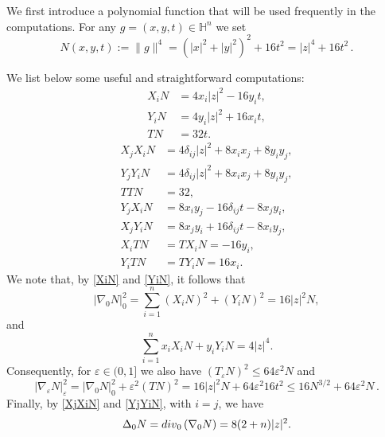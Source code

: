 \documentclass[10pt]{amsart}
\numberwithin{equation}{section}
\theoremstyle{definition}
\newcommand{\He}{\mathbb{H}}
\begin{document}
We first introduce a polynomial function that will be used frequently in the computations. For any $g=(x,y,t) \in \He^n$ we set
\begin{equation}\label{N}
N(x,y,t):= \| g\|^4= \left(|x|^2 + |y|^2\right)^2 + 16 t^2 = |z|^4 +16t^2 \, .
\end{equation}

We list below some useful and straightforward computations: 
\begin{align}
\label{XiN} X_i N &= 4x_i |z|^2  - 16 y_i t,\\
\label{YiN} Y_i N &= 4y_i |z|^2 + 16 x_i t,\\
\label{TN} TN &= 32 t.
\end{align}
\begin{align}
\label{XjXiN} X_j X_i N &= 4 \delta_{ij} |z|^2 + 8x_i x_j + 8 y_i y_j,\\
\label{YjYiN} Y_j Y_i N &= 4 \delta_{ij} |z|^2 + 8x_i x_j + 8 y_i y_j,\\
\label{TTN} TTN &= 32,\\
\label{YjXiN} Y_j X_i N &= 8x_i y_j -16\delta_{ij} t - 8x_j y_i,\\
\label{X_jY_iN} X_j Y_i N &= 8x_j y_i +16\delta_{ij} t - 8x_i y_j,\\
\label{XiTN} X_i T N &= TX_i N = -16 y_i,\\
\label{YiTN} Y_iT N &= TY_i N = 16 x_i.
\end{align}
We note that, by \eqref{XiN} and \eqref{YiN}, it follows that
\begin{equation}
\label{hnormN}|\nabla_0 N|_0^2 = \sum_{i=1}^{n} (X_i N)^2 + (Y_i N)^2 = 16 |z|^2 N ,
\end{equation}
\noindent and
\begin{equation}
\label{xXyY} \sum_{i=1}^n x_i X_iN+y_i Y_i N = 4|z|^4.
\end{equation}
Consequently, for $\varepsilon \in (0,1]$ we also have $(T_\varepsilon N)^2 \leq 64 \varepsilon^2 N$ and  
\begin{equation}
\label{nablaepsN}
|\nabla_\varepsilon N|_\varepsilon^2= |\nabla_0 N|_0^2+\varepsilon^2 (TN)^2=16|z|^2N+64\varepsilon^2 16t^2 \leq 16 N^{3/2}+64 \varepsilon^2N \, .
\end{equation}
Finally, by \eqref{XjXiN} and \eqref{YjYiN}, with $i=j$, we have
\begin{equation}\label{HLapN}
\Delta_0 N = {\rm div}_0 \left(  \nabla_0 N \right)= 8 (2+n) |z|^2. 
\end{equation}
\medskip
\end{document}
